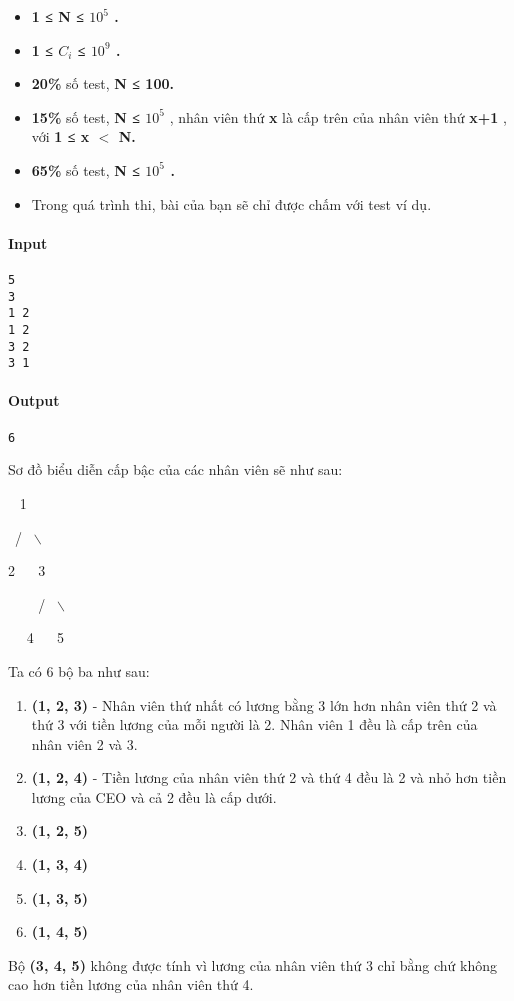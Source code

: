 \begin{itemize}
	\item \textbf{1 ≤ N ≤ $10^{5}$ . }
	\item \textbf{1 ≤ $C_{i}$ ≤ $10^{9}$ . }
	\item \textbf{20\% } số test, \textbf{ N ≤ 100. }
	\item \textbf{15\% } số test, \textbf{ N ≤ $10^{5}$} , nhân viên thứ \textbf{ x } là cấp trên của nhân viên thứ \textbf{ x+1 } , với \textbf{ 1 ≤ x $<$ N. }
	\item \textbf{65\% } số test, \textbf{ N ≤ $10^{5}$ . }
	\item Trong quá trình thi, bài của bạn sẽ chỉ được chấm với test ví dụ.
\end{itemize}
\paragraph{Input}
\begin{verbatim}
5
3
1 2
1 2
3 2
3 1\end{verbatim}

\paragraph{Output}
\begin{verbatim}
6\end{verbatim}
Sơ đồ biểu diễn cấp bậc của các nhân viên sẽ như sau:

  1


 /  $\backslash$


2    3


     /  $\backslash$


   4    5

Ta có 6 bộ ba như sau:
\begin{enumerate}
	\item \textbf{(1, 2, 3) } - Nhân viên thứ nhất có lương bằng 3 lớn hơn nhân viên thứ 2 và thứ 3 với tiền lương của mỗi người là 2. Nhân viên 1 đều là cấp trên của nhân viên 2 và 3.
	\item \textbf{(1, 2, 4) } - Tiền lương của nhân viên thứ 2 và thứ 4 đều là 2 và nhỏ hơn tiền lương của CEO và cả 2 đều là cấp dưới.
	\item \textbf{(1, 2, 5) }
	\item \textbf{(1, 3, 4) }
	\item \textbf{(1, 3, 5) }
	\item \textbf{(1, 4, 5) }
\end{enumerate}

Bộ \textbf{ (3, 4, 5) } không được tính vì lương của nhân viên thứ 3 chỉ bằng chứ không cao hơn tiền lương của nhân viên thứ 4.